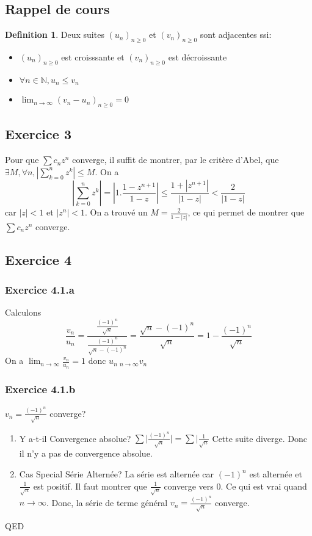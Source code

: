 \documentclass[]{book}
\theoremstyle{definition}
\newtheorem{defn}{Definition}
\newcommand{\bb}[1]{\mathbb{#1}}
\newcommand{\N}{\bb{N}}
\begin{document}
\subsection*{Rappel de cours}
\begin{defn}
Deux suites $(u_n)_{n\geq0}$ et $(v_n)_{n\geq0}$ sont adjacentes ssi:
\begin{itemize}
\item $(u_n)_{n\geq0}$ est croisssante et $(v_n)_{n\geq0}$ est d\'ecroissante
\item $\forall n \in \N, u_n \leq v_n$
\item $\lim_{n \to \infty}(v_n-u_n)_{n\geq0} = 0$
\end{itemize}  
\end{defn}


\newpage
\subsection*{Exercice 3}
Pour que $\sum{c_nz^n}$ converge, il suffit de montrer, par le crit\`ere d'Abel, que $\exists M, \forall n, |\sum_{k=0}^{n}{z^k}| \leq M$. 
On a 
$$|\sum_{k=0}^{n}{z^k}| = |1.\frac{1-z^{n+1}}{1-z}| \leq \frac{1 + |z^{n+1}|}{|1-z|} < \frac{2}{|1-z|} $$
car $|z| < 1$ et $|z^{n}| < 1$. On a trouv\'e un $M = \frac{2}{1-|z|}$, ce qui permet de montrer que $\sum{c_nz^n}$ converge. 


\subsection*{Exercice 4}
\subsubsection*{Exercice 4.1.a}
Calculons
$$
\frac{v_n}{u_n} = \frac{\frac{(-1)^n}{\sqrt{n}}}{\frac{(-1)^n}{\sqrt{n}-(-1)^n}} = \frac{\sqrt{n}-(-1)^n}{\sqrt{n}} = 1 - \frac{(-1)^n}{\sqrt{n}}
$$
On a $\lim_{n \to \infty} \frac{v_n}{u_n} = 1$ donc $u_n ~_{n\to \infty} v_n$ 

\subsubsection*{Exercice 4.1.b}
$v_n = \frac{(-1)^n}{\sqrt{n}}$ converge? \\

\begin{enumerate}
\item Y a-t-il Convergence absolue? $\sum{|\frac{(-1)^n}{\sqrt{n}}}| = \sum{|\frac{1}{\sqrt{n}}}$ Cette suite diverge. Donc il n'y a pas de convergence absolue.
\item Cas Special S\'erie Altern\'ee? La s\'erie est altern\'ee car $(-1)^n$ est altern\'ee et $\frac{1}{\sqrt{n}}$ est positif. Il faut montrer que $\frac{1}{\sqrt{n}}$ converge vers 0. Ce qui est vrai quand $n \to \infty$. Donc, la s\'erie de terme g\'en\'eral $v_n = \frac{(-1)^n}{\sqrt{n}}$ converge.
\end{enumerate} 


QED
\end{document}
